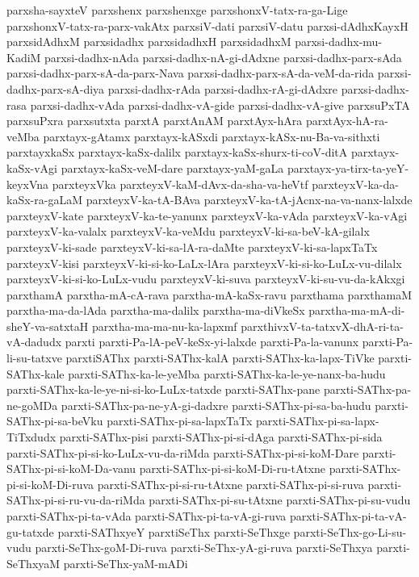 {parxsha-sayxteV
parxshenx
parxshenxge
parxshonxV-tatx-ra-ga-Lige
parxshonxV-tatx-ra-parx-vakAtx
parxsiV-dati
parxsiV-datu
parxsi-dAdhxKayxH
parxsidAdhxM
parxsidadhx
parxsidadhxH
parxsidadhxM
parxsi-dadhx-mu-KadiM
parxsi-dadhx-nAda
parxsi-dadhx-nA-gi-dAdxne
parxsi-dadhx-parx-sAda
parxsi-dadhx-parx-sA-da-parx-Nava
parxsi-dadhx-parx-sA-da-veM-da-rida
parxsi-dadhx-parx-sA-diya
parxsi-dadhx-rAda
parxsi-dadhx-rA-gi-dAdxre
parxsi-dadhx-rasa
parxsi-dadhx-vAda
parxsi-dadhx-vA-gide
parxsi-dadhx-vA-give
parxsuPxTA
parxsuPxra
parxsutxta
parxtA
parxtAnAM
parxtAyx-hAra
parxtAyx-hA-ra-veMba
parxtayx-gAtamx
parxtayx-kASxdi
parxtayx-kASx-nu-Ba-va-sithxti
parxtayxkaSx
parxtayx-kaSx-dalilx
parxtayx-kaSx-shurx-ti-coV-ditA
parxtayx-kaSx-vAgi
parxtayx-kaSx-veM-dare
parxtayx-yaM-gaLa
parxtayx-ya-tirx-ta-yeY-keyxVna
parxteyxVka
parxteyxV-kaM-dAvx-da-sha-va-heVtf
parxteyxV-ka-da-kaSx-ra-gaLaM
parxteyxV-ka-tA-BAva
parxteyxV-ka-tA-jAcnx-na-va-nanx-lalxde
parxteyxV-kate
parxteyxV-ka-te-yanunx
parxteyxV-ka-vAda
parxteyxV-ka-vAgi
parxteyxV-ka-valalx
parxteyxV-ka-veMdu
parxteyxV-ki-sa-beV-kA-gilalx
parxteyxV-ki-sade
parxteyxV-ki-sa-lA-ra-daMte
parxteyxV-ki-sa-lapxTaTx
parxteyxV-kisi
parxteyxV-ki-si-ko-LaLx-lAra
parxteyxV-ki-si-ko-LuLx-vu-dilalx
parxteyxV-ki-si-ko-LuLx-vudu
parxteyxV-ki-suva
parxteyxV-ki-su-vu-da-kAkxgi
parxthamA
parxtha-mA-cA-rava
parxtha-mA-kaSx-ravu
parxthama
parxthamaM
parxtha-ma-da-lAda
parxtha-ma-dalilx
parxtha-ma-diVkeSx
parxtha-ma-mA-di-sheY-va-satxtaH
parxtha-ma-ma-nu-ka-lapxmf
parxthivxV-ta-tatxvX-dhA-ri-ta-vA-dadudx
parxti
parxti-Pa-lA-peV-keSx-yi-lalxde
parxti-Pa-la-vanunx
parxti-Pa-li-su-tatxve
parxtiSAThx
parxti-SAThx-kalA
parxti-SAThx-ka-lapx-TiVke
parxti-SAThx-kale
parxti-SAThx-ka-le-yeMba
parxti-SAThx-ka-le-ye-nanx-ba-hudu
parxti-SAThx-ka-le-ye-ni-si-ko-LuLx-tatxde
parxti-SAThx-pane
parxti-SAThx-pa-ne-goMDa
parxti-SAThx-pa-ne-yA-gi-dadxre
parxti-SAThx-pi-sa-ba-hudu
parxti-SAThx-pi-sa-beVku
parxti-SAThx-pi-sa-lapxTaTx
parxti-SAThx-pi-sa-lapx-TiTxdudx
parxti-SAThx-pisi
parxti-SAThx-pi-si-dAga
parxti-SAThx-pi-sida
parxti-SAThx-pi-si-ko-LuLx-vu-da-riMda
parxti-SAThx-pi-si-koM-Dare
parxti-SAThx-pi-si-koM-Da-vanu
parxti-SAThx-pi-si-koM-Di-ru-tAtxne
parxti-SAThx-pi-si-koM-Di-ruva
parxti-SAThx-pi-si-ru-tAtxne
parxti-SAThx-pi-si-ruva
parxti-SAThx-pi-si-ru-vu-da-riMda
parxti-SAThx-pi-su-tAtxne
parxti-SAThx-pi-su-vudu
parxti-SAThx-pi-ta-vAda
parxti-SAThx-pi-ta-vA-gi-ruva
parxti-SAThx-pi-ta-vA-gu-tatxde
parxti-SAThxyeY
parxtiSeThx
parxti-SeThxge
parxti-SeThx-go-Li-su-vudu
parxti-SeThx-goM-Di-ruva
parxti-SeThx-yA-gi-ruva
parxti-SeThxya
parxti-SeThxyaM
parxti-SeThx-yaM-mADi
}
